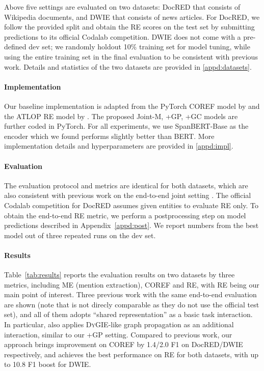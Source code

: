 \documentclass[11pt]{article}
\begin{document}
Above five settings are evaluated on two datasets: DocRED \citep{docred} that consists of Wikipedia documents, and DWIE \citep{dwie} that consists of news articles.
For DocRED, we follow the provided split and obtain the RE scores on the test set by submitting predictions to its official Codalab competition.
DWIE does not come with a pre-defined dev set; we randomly holdout 10\% training set for model tuning, while using the entire training set in the final evaluation to be consistent with previous work.
Details and statistics of the two datasets are provided in \ref{appd:datasets}.

\paragraph{Implementation}
Our baseline implementation is adapted from the PyTorch COREF model by \citet{xu-choi-2020-revealing} and the ATLOP RE model by \citet{atlop}. The proposed Joint-M, +GP, +GC models are further coded in PyTorch. For all experiments, we use SpanBERT-Base \citep{spanbert} as the encoder which we found performs slightly better than BERT. More implementation details and hyperparameters are provided in \ref{appd:impl}.

\paragraph{Evaluation}
The evaluation protocol and metrics are identical for both datasets, which are also consistent with previous work on the end-to-end joint setting \citep{joint-mil,joint-kb}.
The official Codalab competition for DocRED assumes given entities to evaluate RE only. To obtain the end-to-end RE metric, we perform a postprocessing step on model predictions described in Appendix~\ref{appd:post}. We report numbers from the best model out of three repeated runs on the dev set.

\paragraph{Results}
Table~\ref{tab:results} reports the evaluation results on two datasets by three metrics, including ME (mention extraction), COREF and RE, with RE being our main point of interest. 
Three previous work with the same end-to-end evaluation are shown (note that \citet{joint-mil} is not direcly comparable as they do not use the official test set), and all of them adopts ``shared representation'' as a basic task interaction. In particular, \citet{dwie} also applies D\textsc{y}GIE-like graph propagation as an additional interaction, similar to our +GP setting. 
Compared to previous work, our approach brings improvement on COREF by 1.4/2.0 F1 on DocRED/DWIE respectively, and achieves the best performance on RE for both datasets, with up to 10.8 F1 boost for DWIE.
\end{document}
